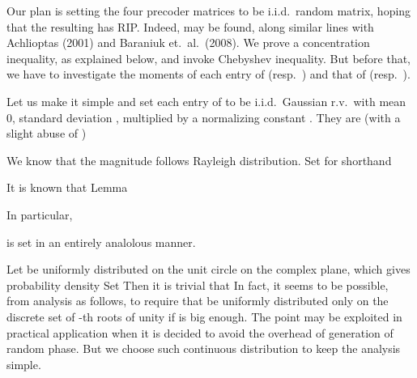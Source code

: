 \startsection [title={Confirming Restricted Isometry of Beamformer}]
\startsubsection [title={Design of Digital Beamformer Entries}]

Our plan is setting the four precoder matrices to be i.i.d.\ random matrix, hoping that the resulting  has RIP.
Indeed,  may be found, along similar lines with Achlioptas (2001) and Baraniuk et.\ al.\ (2008).
We prove a concentration inequality, as explained below, and invoke Chebyshev inequality.
But before that, we have to investigate the moments of each entry of  (resp.\ ) and that of  (resp.\ ).

Let us make it simple and set each entry of  to be i.i.d.\ Gaussian r.v.\ with mean 0, standard deviation , multiplied by a normalizing constant .
They are (with a slight abuse of )

We know that the magnitude  follows Rayleigh distribution.
Set for shorthand

It is known that
\Result
{Lemma}
{
}

In particular,

 is set in an entirely analolous manner.

\stopsubsection

\startsubsection [title={Design of Analog Beamformer Entries}]

Let  be uniformly distributed on the unit circle on the complex plane, which gives probability density
Set
Then it is trivial that
In fact, it seems to be possible, from analysis as follows, to require that  be uniformly distributed only on the discrete set of -th roots of unity if  is big enough.
The point may be exploited in practical application when it is decided to avoid the overhead of generation of random phase.
But we choose such continuous distribution to keep the analysis simple.

